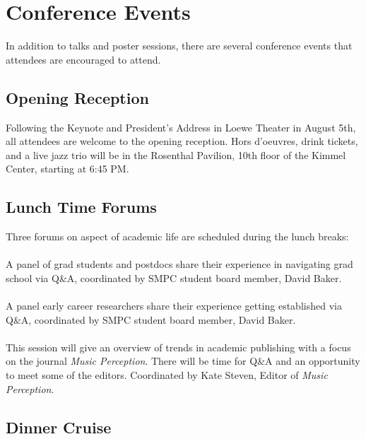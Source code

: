 
\section*{Conference Events}
In addition to talks and poster sessions, there are several conference events that attendees are encouraged to attend.

\subsection*{Opening Reception}
Following the Keynote and President's Address in Loewe Theater in August 5th, all attendees are welcome to the opening reception. Hors d'oeuvres, drink tickets, and a live jazz trio will be in the Rosenthal Pavilion, 10th floor of the Kimmel Center, starting at 6:45 PM.

\subsection*{Lunch Time Forums}
Three forums on aspect of academic life are scheduled during the lunch breaks:\\

\\
A panel of grad students and postdocs share their experience in navigating grad school via Q\&A, coordinated by SMPC student board member, David Baker.\\

\\
 A panel  early career researchers share their experience getting established via Q\&A, coordinated by SMPC student board member, David Baker.\\

\\ 
This session will give an overview of trends in academic publishing with a focus on the journal {\it Music Perception}.  There will be time for Q\&A and an opportunity to meet some of the editors. Coordinated by Kate Steven, Editor of {\it Music Perception}.

\subsection*{Dinner Cruise}

